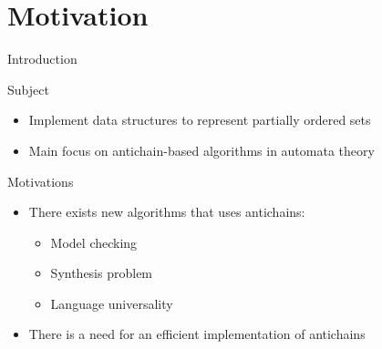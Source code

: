 \documentclass[11pt]{beamer}
\begin{document}
\section{Motivation}
\begin{frame}{Introduction}{}
    \begin{block}{Subject}
        \begin{itemize}
            \item Implement data structures to represent partially ordered sets
            \item Main focus on antichain-based algorithms in automata theory
        \end{itemize}
    \end{block}
    \begin{block}{Motivations}
        \begin{itemize}
            \item There exists new algorithms that uses antichains:
            \begin{itemize}
                \item Model checking
                \item Synthesis problem
                \item Language universality
            \end{itemize}
            \item There is a need for an efficient implementation of antichains
        \end{itemize}
    \end{block}
\end{frame}
\end{document}
